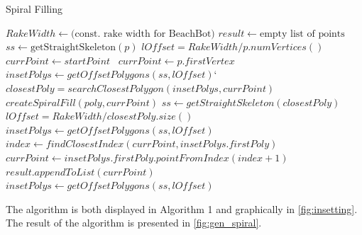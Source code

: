 \begin{algorithm}[H]
\begin{algorithmic}
\caption{Spiral Filling}\label{spiral_fill}

\State $RakeWidth \gets \text{(const. rake width for BeachBot)}$
\State $result \gets \text{empty list of points}$
\State $ss \gets \text{getStraightSkeleton}(p)$
\State $lOffset = RakeWidth/p.numVertices()$
 $currPoint \gets startPoint$ 
\Else ~$ currPoint \gets p.firstVertex$ 
\EndIf
\State $insetPolys \gets getOffsetPolygons(ss, lOffset)$`
	\State $closestPoly = searchClosestPolygon(insetPolys, currPoint)$
		\State $createSpiralFill(poly, currPoint)$
	\EndFor
	\State $ss \gets getStraightSkeleton(closestPoly)$
	\State $lOffset = RakeWidth/closestPoly.size()$
	\State $insetPolys \gets getOffsetPolygons(ss, lOffset)$
\EndIf
\State $index \gets findClosestIndex(currPoint, insetPolys.firstPoly)$
\State $currPoint \gets insetPolys.firstPoly.pointFromIndex(index + 1)$
\State $result.appendToList(currPoint)$
\State $insetPolys \gets getOffsetPolygons(ss, lOffset)$
\EndWhile
\EndFunction

\end{algorithmic}

\end{algorithm}

The algorithm is both displayed in Algorithm 1 and graphically in \autoref{fig:insetting}. The result of the algorithm is presented in \autoref{fig:gen_spiral}.

